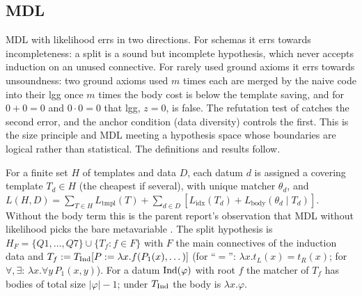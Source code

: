 \subsection{MDL}\label{app:many:mdl}

MDL with likelihood errs in two directions. For schemas it errs towards incompleteness: a split is a sound but incomplete
hypothesis, which never accepts induction on an unused connective. For rarely used ground axioms it errs towards
unsoundness: two ground axioms used $m$ times each are merged by the naive code into their lgg once $m$ times the body
cost is below the template saving, and for $0+0=0$ and $0\cdot0=0$ that lgg, $z=0$, is false. The refutation test of
\DTRC{} catches the second error, and the anchor condition (data diversity) controls the first. This is the size principle
\citep{tenenbaum2001generalization} and MDL \citep{rissanen1978modeling} meeting a hypothesis space whose boundaries are
logical rather than statistical. The definitions and results follow.

For a finite set $H$ of templates and data $D$, each datum $d$ is assigned a covering template $T_d\in H$ (the cheapest if
several), with unique matcher $\theta_d$, and $L(H,D)=\sum_{T\in H}L_{\mathrm{tmpl}}(T)+\sum_{d\in D}[L_{\mathrm{idx}}(T_d)+
L_{\mathrm{body}}(\theta_d\mid T_d)]$. Without the body term this is the parent report's observation that MDL without
likelihood picks the bare metavariable \citep{claude2026whatfollows}. The split hypothesis is $H_F=\{Q1,\dots,Q7\}\cup\{T_f:f\in
F\}$ with $F$ the main connectives of the induction data and $T_f:=T_{\mathrm{Ind}}[P:=\lambda x.f(P_1(x),\dots)]$ (for ``$=$'':
$\lambda x.t_L(x)=t_R(x)$; for $\forall,\exists$: $\lambda x.\forall y\,P_1(x,y)$). For a datum $\mathrm{Ind}(\varphi)$ with root $f$ the matcher of
$T_f$ has bodies of total size $|\varphi|-1$; under $T_{\mathrm{Ind}}$ the body is $\lambda x.\varphi$.

